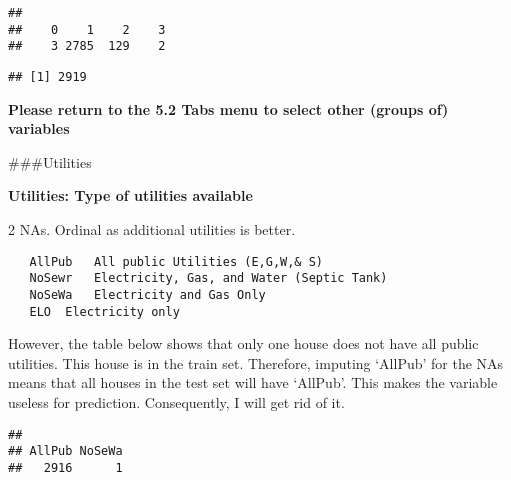\documentclass[]{article}
\newenvironment{Shaded}{\begin{snugshade}}{\end{snugshade}}
\newcommand{\DecValTok}[1]{\textcolor[rgb]{0.00,0.00,0.81}{#1}}
\newcommand{\KeywordTok}[1]{\textcolor[rgb]{0.13,0.29,0.53}{\textbf{#1}}}
\newcommand{\NormalTok}[1]{#1}
\newcommand{\OperatorTok}[1]{\textcolor[rgb]{0.81,0.36,0.00}{\textbf{#1}}}
\newcommand{\StringTok}[1]{\textcolor[rgb]{0.31,0.60,0.02}{#1}}
\begin{document}
\begin{verbatim}
## 
##    0    1    2    3 
##    3 2785  129    2
\end{verbatim}

\begin{Shaded}
\end{Shaded}

\begin{verbatim}
## [1] 2919
\end{verbatim}

\textbf{Please return to the 5.2 Tabs menu to select other (groups of)
variables}

\#\#\#Utilities

\textbf{Utilities: Type of utilities available}

2 NAs. Ordinal as additional utilities is better.

\begin{verbatim}
   AllPub   All public Utilities (E,G,W,& S)    
   NoSewr   Electricity, Gas, and Water (Septic Tank)
   NoSeWa   Electricity and Gas Only
   ELO  Electricity only
\end{verbatim}

However, the table below shows that only one house does not have all
public utilities. This house is in the train set. Therefore, imputing
`AllPub' for the NAs means that all houses in the test set will have
`AllPub'. This makes the variable useless for prediction. Consequently,
I will get rid of it.

\begin{Shaded}
\end{Shaded}

\begin{verbatim}
## 
## AllPub NoSeWa 
##   2916      1
\end{verbatim}

\begin{Shaded}
\end{Shaded}
\end{document}
